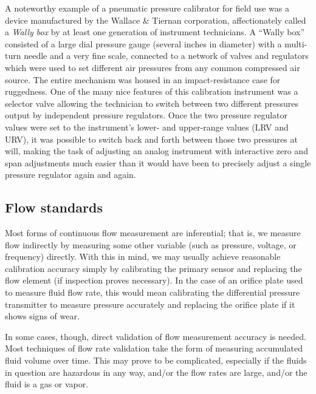 A noteworthy example of a pneumatic pressure calibrator for field use was a device manufactured by the Wallace \& Tiernan corporation, affectionately called a \textit{Wally box} by at least one generation of instrument technicians.  A ``Wally box'' consisted of a large dial pressure gauge (several inches in diameter) with a multi-turn needle and a very fine scale, connected to a network of valves and regulators which were used to set different air pressures from any common compressed air source.  The entire mechanism was housed in an impact-resistance case for ruggedness.  One of the many nice features of this calibration instrument was a selector valve allowing the technician to switch between two different pressures output by independent pressure regulators.  Once the two pressure regulator values were set to the instrument's lower- and upper-range values (LRV and URV), it was possible to switch back and forth between those two pressures at will, making the task of adjusting an analog instrument with interactive zero and span adjustments much easier than it would have been to precisely adjust a single pressure regulator again and again.       






\filbreak
\subsection{Flow standards}

Most forms of continuous flow measurement are inferential; that is, we measure flow indirectly by measuring some other variable (such as pressure, voltage, or frequency) directly.  With this in mind, we may usually achieve reasonable calibration accuracy simply by calibrating the primary sensor and replacing the flow element (if inspection proves necessary).  In the case of an orifice plate used to measure fluid flow rate, this would mean calibrating the differential pressure transmitter to measure pressure accurately and replacing the orifice plate if it shows signs of wear. 

In some cases, though, direct validation of flow measurement accuracy is needed.  Most techniques of flow rate validation take the form of measuring accumulated fluid volume over time.  This may prove to be complicated, especially if the fluids in question are hazardous in any way, and/or the flow rates are large, and/or the fluid is a gas or vapor.

